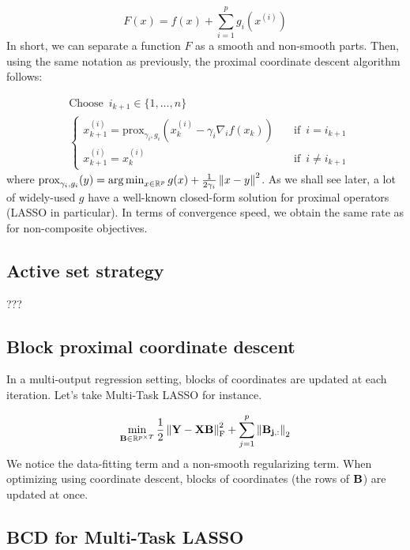 \documentclass[a4paper,10pt]{article}
\theoremstyle{definition}
\begin{document}
\begin{equation*}
    F(x) = f(x) + \sum_{i=1}^p g_i(x^{(i)})
\end{equation*}
%
In short, we can separate a function $F$ as a smooth and non-smooth parts. Then, using the same notation 
as previously, the proximal coordinate descent algorithm follows:

\begin{align*}
    &\text{Choose} \enspace i_{k+1} \in \{1, \dots, n\} \\
    &\begin{cases}
        x_{k+1}^{(i)} = \text{prox}_{\gamma_i, g_i}(x_k^{(i)} - \gamma_i \nabla_i f(x_k)) \quad &\text{if} \enspace i = i_{k+1} \\
        x_{k+1}^{(i)} = x_{k}^{(i)} \quad &\text{if} \enspace i \neq i_{k+1} 
    \end{cases}
\end{align*}
%
where $\text{prox}_{\gamma_i, g_i}(y)=\operatorname*{arg\,min}_{x \in \mathbb{R}^p} g(x) + \frac{1}{2\gamma_i} \left \lVert x-y \right \rVert^2$. 
As we shall see later, a lot of widely-used $g$ have a well-known closed-form solution for proximal operators
(LASSO in particular).
%
In terms of convergence speed, we obtain the same rate as for non-composite objectives.

\subsection*{Active set strategy}

???


\subsection*{Block proximal coordinate descent}

In a multi-output regression setting, blocks of coordinates are updated at each iteration. Let's take Multi-Task
LASSO for instance. 

\begin{equation*}
    \min_{\mathbf{B} \in \mathbb{R}^{p \times T}}
    \frac{1}{2} \left \lVert \bf{Y - XB} \right \rVert^2_\text{F}
    + \sum_{j=1}^p \left \lVert \bf{B}_{j, :} \right \rVert_2
\end{equation*}
%
We notice the data-fitting term and a non-smooth regularizing term. When optimizing using
coordinate descent, blocks of coordinates (the rows of $\bf{B}$) are updated at once.

\subsection*{BCD for Multi-Task LASSO}
\end{document}
